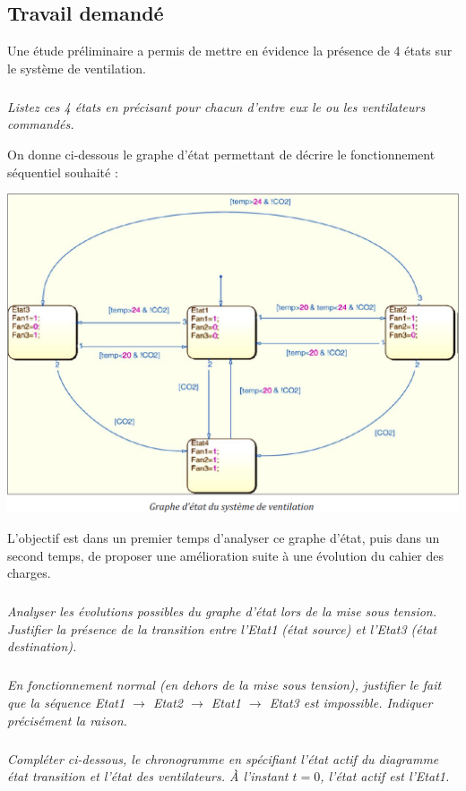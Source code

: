 \documentclass[10pt]{article}
\begin{document}
\subsection*{Travail demandé}
Une étude préliminaire a permis de mettre en évidence la présence de 4 états sur le système de
ventilation.

\setcounter{subparagraph}{0}
\subparagraph{}
\textit{Listez ces 4 états en précisant pour chacun d’entre eux le ou les ventilateurs commandés.}

On donne ci-dessous le graphe d’état permettant de décrire le fonctionnement séquentiel
souhaité :


\begin{center}
\includegraphics[width=.5\textwidth]{images/fig_09}
\end{center}

L’objectif est dans un premier temps d’analyser ce graphe d’état, puis dans un second temps, de
proposer une amélioration suite à une évolution du cahier des charges.

\subparagraph{}
\textit{Analyser les évolutions possibles du graphe d’état lors de la mise sous tension. Justifier la
présence de la transition entre l’Etat1 (état source) et l’Etat3 (état destination).}

\subparagraph{}
\textit{En fonctionnement normal (en dehors de la mise sous tension), justifier le fait que la
séquence Etat1 $\rightarrow$ Etat2 $\rightarrow$ Etat1 $\rightarrow$ Etat3 est impossible. Indiquer précisément la raison.}

\subparagraph{}
\textit{Compléter ci-dessous, le chronogramme en spécifiant l’état actif du diagramme état transition et l’état des ventilateurs. \`A l'instant $t=0$, l’état actif est l’Etat1.}
\end{document}
